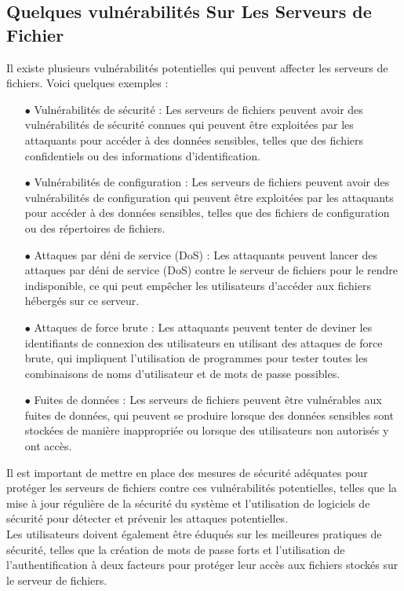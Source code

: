 \subsection{Quelques vulnérabilités Sur Les Serveurs de Fichier}
Il existe plusieurs vulnérabilités potentielles qui peuvent affecter les serveurs de fichiers. Voici quelques exemples :

\begin{enumerate}
\item[$\bullet$]  Vulnérabilités de sécurité : Les serveurs de fichiers peuvent avoir des vulnérabilités de sécurité connues qui peuvent être exploitées par les attaquants pour accéder à des données sensibles, telles que des fichiers confidentiels ou des informations d'identification.
 
 \item[$\bullet$]  Vulnérabilités de configuration : Les serveurs de fichiers peuvent avoir des vulnérabilités de configuration qui peuvent être exploitées par les attaquants pour accéder à des données sensibles, telles que des fichiers de configuration ou des répertoires de fichiers.
 
\item[$\bullet$] Attaques par déni de service (DoS) : Les attaquants peuvent lancer des attaques par déni de service (DoS) contre le serveur de fichiers pour le rendre indisponible, ce qui peut empêcher les utilisateurs d'accéder aux fichiers hébergés sur ce serveur.
 
 \item[$\bullet$]  Attaques de force brute : Les attaquants peuvent tenter de deviner les identifiants de connexion des utilisateurs en utilisant des attaques de force brute, qui impliquent l'utilisation de programmes pour tester toutes les combinaisons de noms d'utilisateur et de mots de passe possibles.
 
\item[$\bullet$]  Fuites de données : Les serveurs de fichiers peuvent être vulnérables aux fuites de données, qui peuvent se produire lorsque des données sensibles sont stockées de manière inappropriée ou lorsque des utilisateurs non autorisés y ont accès.
\end{enumerate}

Il est important de mettre en place des mesures de sécurité adéquates pour protéger les serveurs de fichiers contre ces vulnérabilités potentielles, telles que la mise à jour régulière de la sécurité du système et l'utilisation de logiciels de sécurité pour détecter et prévenir les attaques potentielles.\\
 Les utilisateurs doivent également être éduqués sur les meilleures pratiques de sécurité, telles que la création de mots de passe forts et l'utilisation de l'authentification à deux facteurs pour protéger leur accès aux fichiers stockés sur le serveur de fichiers.
